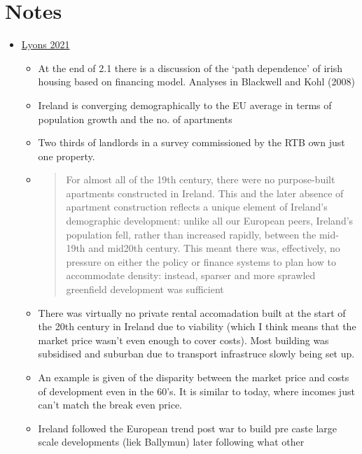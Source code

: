 \documentclass[11pt]{article}
\begin{document}
\hypertarget{notes}{%
\section{Notes}\label{notes}}

\begin{itemize}
\tightlist
\item
  \href{https://irp.cdn-website.com/4065c16c/files/uploaded/Identify\%20Consulting\%20June\%202021\%20PRS\%20Report\%20for\%20IIP\%20-\%20final.pdf}{Lyons
  2021}

  \begin{itemize}
  \item
    At the end of 2.1 there is a discussion of the `path dependence' of
    irish housing based on financing model. Analyses in Blackwell and
    Kohl (2008)
  \item
    Ireland is converging demographically to the EU average in terms of
    population growth and the no. of apartments
  \item
    Two thirds of landlords in a survey commissioned by the RTB own just
    one property.
  \item
    \begin{quote}
    For almost all of the 19th century, there were no purpose-built
    apartments constructed in Ireland. This and the later absence of
    apartment construction reflects a unique element of Ireland's
    demographic development: unlike all our European peers, Ireland's
    population fell, rather than increased rapidly, between the mid-19th
    and mid20th century. This meant there was, effectively, no pressure
    on either the policy or finance systems to plan how to accommodate
    density: instead, sparser and more sprawled greenfield development
    was sufficient
    \end{quote}
  \item
    There was virtually no private rental accomadation built at the
    start of the 20th century in Ireland due to viability (which I think
    means that the market price wasn't even enough to cover costs). Most
    building was subsidised and suburban due to transport infrastruce
    slowly being set up.
  \item
    An example is given of the disparity between the market price and
    costs of development even in the 60's. It is similar to today, where
    incomes just can't match the break even price.
  \item
    Ireland followed the European trend post war to build pre caste
    large scale developments (liek Ballymun) later following what other

\end{itemize}
\end{itemize}
\end{document}
